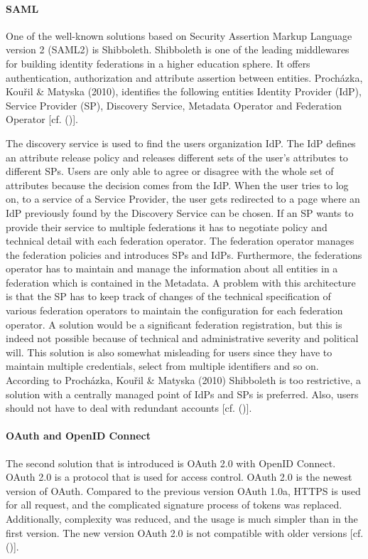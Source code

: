 {{		\paragraph{SAML}
		\label{SAML}
		One of the well-known solutions based on Security Assertion Markup Language version 2 (SAML2) is Shibboleth. Shibboleth is one of the leading middlewares for building identity federations in a higher education sphere. It offers authentication, authorization and attribute assertion between entities. Procházka, Kouřil \& Matyska (2010), identifies the following entities Identity Provider (IdP), Service Provider (SP), Discovery Service, Metadata Operator and Federation Operator  [cf. (\cite{Prochazka:2010:UCA})].
		
		The discovery service is used to find the users organization IdP. The IdP defines an attribute release policy and releases different sets of the user's attributes to different SPs. Users are only able to agree or disagree with the whole set of attributes because the decision comes from the IdP. When the user tries to log on, to a service of a Service Provider, the user gets redirected to a page where an IdP previously found by the Discovery Service can be chosen. If an SP wants to provide their service to multiple federations it has to negotiate policy and technical detail with each federation operator. The federation operator manages the federation policies and introduces SPs and IdPs. Furthermore, the federations operator has to maintain and manage the information about all entities in a federation which is contained in the Metadata. A problem with this architecture is that the SP has to keep track of changes of the technical specification of various federation operators to maintain the configuration for each federation operator. A solution would be a significant federation registration, but this is indeed not possible because of technical and administrative severity and political will. This solution is also somewhat misleading for users since they have to maintain multiple credentials, select from multiple identifiers and so on. According to Procházka, Kouřil \& Matyska (2010) Shibboleth is too restrictive, a solution with a centrally managed point of IdPs and SPs is preferred. Also, users should not have to deal with redundant accounts [cf. (\cite{Prochazka:2010:UCA})].		
		
		\paragraph{OAuth and OpenID Connect}
		\label{OAuthAndOpenID}
		The second solution that is introduced is OAuth 2.0 with OpenID Connect.	OAuth 2.0 is a protocol that is used for access control. OAuth 2.0 is the newest version of  OAuth. Compared to the previous version OAuth 1.0a, HTTPS is used for all request, and the complicated signature process of tokens was replaced. Additionally, complexity was reduced, and the usage is much simpler than in the first version. The new version OAuth 2.0 is not compatible with older versions [cf.  (\cite{LeBlanc:2011:SocialApplications})].
		
}}
